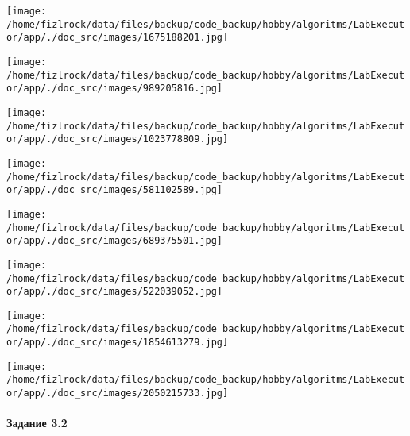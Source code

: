 \documentclass[a4paper, 12pt]{article}
\begin{document}
\texttt{[image: /home/fizlrock/data/files/backup/code\_backup/hobby/algoritms/LabExecutor/app/./doc\_src/images/1675188201.jpg]}

\texttt{[image: /home/fizlrock/data/files/backup/code\_backup/hobby/algoritms/LabExecutor/app/./doc\_src/images/989205816.jpg]}

\texttt{[image: /home/fizlrock/data/files/backup/code\_backup/hobby/algoritms/LabExecutor/app/./doc\_src/images/1023778809.jpg]}

\texttt{[image: /home/fizlrock/data/files/backup/code\_backup/hobby/algoritms/LabExecutor/app/./doc\_src/images/581102589.jpg]}

\texttt{[image: /home/fizlrock/data/files/backup/code\_backup/hobby/algoritms/LabExecutor/app/./doc\_src/images/689375501.jpg]}

\texttt{[image: /home/fizlrock/data/files/backup/code\_backup/hobby/algoritms/LabExecutor/app/./doc\_src/images/522039052.jpg]}

\texttt{[image: /home/fizlrock/data/files/backup/code\_backup/hobby/algoritms/LabExecutor/app/./doc\_src/images/1854613279.jpg]}

\texttt{[image: /home/fizlrock/data/files/backup/code\_backup/hobby/algoritms/LabExecutor/app/./doc\_src/images/2050215733.jpg]}
\pagebreak

\paragraph{Задание 3.2}
\end{document}
